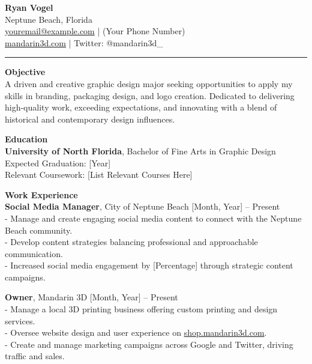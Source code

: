 \documentclass[10pt]{article}
\begin{document}
\begin{center}
    {\LARGE \textbf{Ryan Vogel}} \\
    Neptune Beach, Florida \\
    \href{mailto:youremail@example.com}{youremail@example.com} | (Your Phone Number) \\
    \href{https://mandarin3d.com}{mandarin3d.com} | Twitter: @mandarin3d\_
\end{center}

\vspace{0.5cm}
\hrule
\vspace{0.5cm}

\textbf{Objective} \\
A driven and creative graphic design major seeking opportunities to apply my skills in branding, packaging design, and logo creation. Dedicated to delivering high-quality work, exceeding expectations, and innovating with a blend of historical and contemporary design influences.

\vspace{0.5cm}

\textbf{Education} \\
\textbf{University of North Florida}, Bachelor of Fine Arts in Graphic Design \hfill Expected Graduation: [Year] \\
Relevant Coursework: [List Relevant Courses Here]

\vspace{0.5cm}

\textbf{Work Experience} \\
\textbf{Social Media Manager}, City of Neptune Beach \hfill [Month, Year] -- Present \\
- Manage and create engaging social media content to connect with the Neptune Beach community. \\
- Develop content strategies balancing professional and approachable communication. \\
- Increased social media engagement by [Percentage] through strategic content campaigns.

\textbf{Owner}, Mandarin 3D \hfill [Month, Year] -- Present \\
- Manage a local 3D printing business offering custom printing and design services. \\
- Oversee website design and user experience on \href{https://shop.mandarin3d.com}{shop.mandarin3d.com}. \\
- Create and manage marketing campaigns across Google and Twitter, driving traffic and sales.
\end{document}
